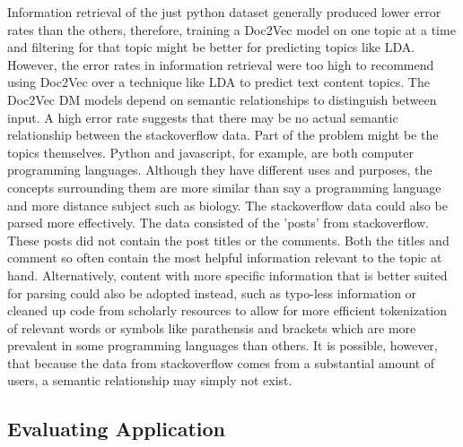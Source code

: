 Information retrieval of the just python dataset generally produced lower error rates than the others, therefore, training a Doc2Vec model on one topic at a time and filtering for that topic might be better for predicting topics like LDA. However, the error rates in information retrieval were too high to recommend using Doc2Vec over a technique like LDA to predict text content topics. The Doc2Vec DM models depend on semantic relationships to distinguish between input. A high error rate suggests that there may be no actual semantic relationship between the stackoverflow data. Part of the problem might be the topics themselves. Python and javascript, for example, are both computer programming languages. Although they have different uses and purposes, the concepts surrounding them are more similar than say a programming language and more distance subject such as biology. The stackoverflow data could also be parsed more effectively. The data consisted of the 'posts' from stackoverflow. These posts did not contain the post titles or the comments. Both the titles and comment so often contain the most helpful information relevant to the topic at hand. Alternatively, content with more specific information that is better suited for parsing could also be adopted instead, such as typo-less information or cleaned up code from scholarly resources to allow for more efficient tokenization of relevant words or symbols like parathensis and brackets which are more prevalent in some programming languages than others. It is possible, however, that because the data from stackoverflow comes from a substantial amount of users, a semantic relationship may simply not exist. 

\subsection{Evaluating Application}

